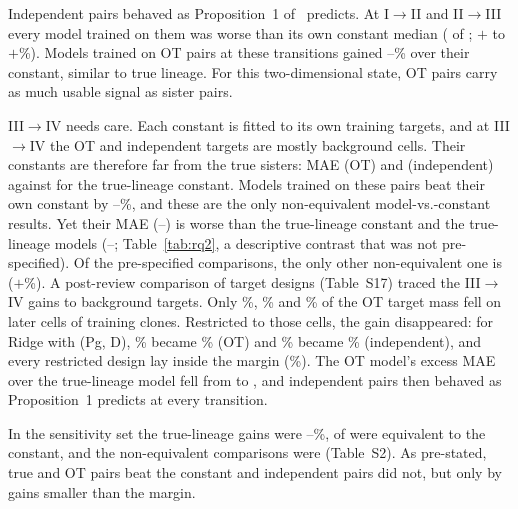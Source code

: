 \documentclass[10pt,journal,compsoc]{IEEEtran}
\begin{document}
Independent pairs behaved as Proposition~1 of~\cite{Kanu_TCBB} predicts. At I$\to$II and
II$\to$III every model trained on them was worse than its own constant median
(\rqTwoIndNWorse{} of \rqTwoIndN; $+$\rqTwoIndPctMin{} to $+$\rqTwoIndPctMax\%). Models
trained on OT pairs at these transitions gained \rqTwoOTGainMinPct--\rqTwoOTGainMaxPct\%
over their constant, similar to true lineage. For this two-dimensional state, OT pairs carry
as much usable signal as sister pairs.

III$\to$IV needs care. Each constant is fitted to its own training targets, and at
III$\to$IV the OT and independent targets are mostly background cells. Their constants are
therefore far from the true sisters: MAE \rqTwoThreeConstOt{} (OT) and
\rqTwoThreeConstIndependent{} (independent) against \rqTwoThreeConstTrue{} for the
true-lineage constant. Models trained on these pairs beat their own constant by
\rqTwoThreeOIGainMinPct--\rqTwoThreeOIGainMaxPct\%, and these are the only
\rqTwoNNonEquivThree{} non-equivalent model-vs.-constant results. Yet their MAE
(\rqTwoThreeOIMin--\rqTwoThreeOIMax) is worse than the true-lineage constant and the
true-lineage models (\rqTwoThreeTrueMin--\rqTwoThreeTrueMax; Table~\ref{tab:rq2}, a
descriptive contrast that was not pre-specified). Of the \rqTwoNComparisons{} pre-specified
comparisons, the only other non-equivalent one is \rqTwoNEOtherDesc{}
($+$\rqTwoNEOtherPct\%). A post-review comparison of target designs (Table~S17) traced the
III$\to$IV gains to background targets. Only \fgShareOne\%, \fgShareTwo\% and
\fgShareThree\% of the OT target mass fell on later cells of training clones. Restricted to
those cells, the gain disappeared: for Ridge with (Pg, D), \tdThreeSampOTPct\% became
\tdThreeFgExpOTPct\% (OT) and \tdThreeSampIndPct\% became \tdThreeFgExpIndPct\%
(independent), and every restricted design lay inside the margin (\tdThreeFgPct\%). The OT
model's excess MAE over the true-lineage model fell from \tdThreeVsTrueSamp{} to
\tdThreeVsTrueFg, and independent pairs then behaved as Proposition~1 predicts at every
transition.

In the sensitivity set the true-lineage gains were
\rqTwoSensTrueGainMinPct--\rqTwoSensTrueGainMaxPct\%, \rqTwoSensTrueNEquiv{} of
\rqTwoTrueN{} were equivalent to the constant, and the non-equivalent comparisons were
\rqTwoSensSameNonEquiv{} (Table~S2). As pre-stated, true and OT pairs beat the constant
and independent pairs did not, but only by gains smaller than the margin.
\end{document}
